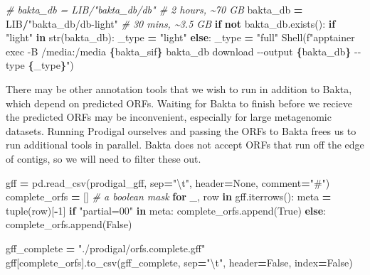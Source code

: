 \documentclass[
]{book}
\newenvironment{Shaded}{\begin{snugshade}}{\end{snugshade}}
\newcommand{\BuiltInTok}[1]{#1}
\newcommand{\CharTok}[1]{\textcolor[rgb]{0.31,0.60,0.02}{#1}}
\newcommand{\CommentTok}[1]{\textcolor[rgb]{0.56,0.35,0.01}{\textit{#1}}}
\newcommand{\ControlFlowTok}[1]{\textcolor[rgb]{0.13,0.29,0.53}{\textbf{#1}}}
\newcommand{\DecValTok}[1]{\textcolor[rgb]{0.00,0.00,0.81}{#1}}
\newcommand{\KeywordTok}[1]{\textcolor[rgb]{0.13,0.29,0.53}{\textbf{#1}}}
\newcommand{\NormalTok}[1]{#1}
\newcommand{\OperatorTok}[1]{\textcolor[rgb]{0.81,0.36,0.00}{\textbf{#1}}}
\newcommand{\SpecialCharTok}[1]{\textcolor[rgb]{0.81,0.36,0.00}{\textbf{#1}}}
\newcommand{\SpecialStringTok}[1]{\textcolor[rgb]{0.31,0.60,0.02}{#1}}
\newcommand{\StringTok}[1]{\textcolor[rgb]{0.31,0.60,0.02}{#1}}
\newcommand{\VariableTok}[1]{\textcolor[rgb]{0.00,0.00,0.00}{#1}}
\begin{document}
\begin{Shaded}
\begin{Highlighting}[numbers=left,,]
\CommentTok{\# bakta\_db = LIB/"bakta\_db/db"        \# 2 hours, \textasciitilde{}70 GB}
\NormalTok{bakta\_db }\OperatorTok{=}\NormalTok{ LIB}\OperatorTok{/}\StringTok{"bakta\_db/db{-}light"}  \CommentTok{\# 30 mins, \textasciitilde{}3.5 GB}
\ControlFlowTok{if} \KeywordTok{not}\NormalTok{ bakta\_db.exists():}
    \ControlFlowTok{if} \StringTok{"light"} \KeywordTok{in} \BuiltInTok{str}\NormalTok{(bakta\_db):}
\NormalTok{        \_type }\OperatorTok{=} \StringTok{"light"}
    \ControlFlowTok{else}\NormalTok{:}
\NormalTok{        \_type }\OperatorTok{=} \StringTok{"full"}
\NormalTok{    Shell(}\SpecialStringTok{f"apptainer exec {-}B /media:/media }\SpecialCharTok{\{}\NormalTok{bakta\_sif}\SpecialCharTok{\}}\SpecialStringTok{ bakta\_db download {-}{-}output }\SpecialCharTok{\{}\NormalTok{bakta\_db}\SpecialCharTok{\}}\SpecialStringTok{ {-}{-}type }\SpecialCharTok{\{}\NormalTok{\_type}\SpecialCharTok{\}}\SpecialStringTok{"}\NormalTok{)}
\end{Highlighting}
\end{Shaded}

There may be other annotation tools that we wish to run in addition to Bakta, which depend on predicted ORFs.
Waiting for Bakta to finish before we recieve the predicted ORFs may be inconvenient, especially for large metagenomic datasets.
Running Prodigal ourselves and passing the ORFs to Bakta frees us to run additional tools in parallel. Bakta does not accept ORFs
that run off the edge of contigs, so we will need to filter these out.

\begin{Shaded}
\begin{Highlighting}[numbers=left,,]
\NormalTok{gff }\OperatorTok{=}\NormalTok{ pd.read\_csv(prodigal\_gff, sep}\OperatorTok{=}\StringTok{"}\CharTok{\textbackslash{}t}\StringTok{"}\NormalTok{, header}\OperatorTok{=}\VariableTok{None}\NormalTok{, comment}\OperatorTok{=}\StringTok{"\#"}\NormalTok{)}
\NormalTok{complete\_orfs }\OperatorTok{=}\NormalTok{ [] }\CommentTok{\# a boolean mask}
\ControlFlowTok{for}\NormalTok{ \_, row }\KeywordTok{in}\NormalTok{ gff.iterrows():}
\NormalTok{    meta }\OperatorTok{=} \BuiltInTok{tuple}\NormalTok{(row)[}\OperatorTok{{-}}\DecValTok{1}\NormalTok{]}
    \ControlFlowTok{if} \StringTok{"partial=00"} \KeywordTok{in}\NormalTok{ meta:}
\NormalTok{        complete\_orfs.append(}\VariableTok{True}\NormalTok{)}
    \ControlFlowTok{else}\NormalTok{:}
\NormalTok{        complete\_orfs.append(}\VariableTok{False}\NormalTok{)}

\NormalTok{gff\_complete }\OperatorTok{=} \StringTok{"./prodigal/orfs.complete.gff"}
\NormalTok{gff[complete\_orfs].to\_csv(gff\_complete, sep}\OperatorTok{=}\StringTok{"}\CharTok{\textbackslash{}t}\StringTok{"}\NormalTok{, header}\OperatorTok{=}\VariableTok{False}\NormalTok{, index}\OperatorTok{=}\VariableTok{False}\NormalTok{)}
\end{Highlighting}
\end{Shaded}
\end{document}
